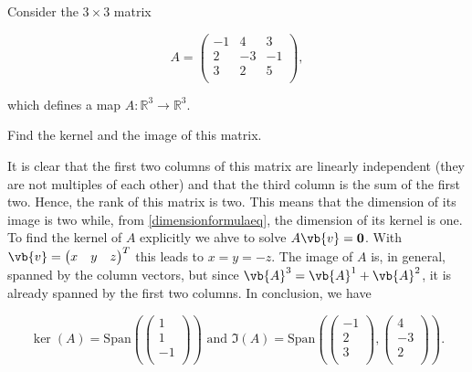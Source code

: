 \documentclass[a4paper,12pt]{report}
\begin{document}
{Consider the \(3 \times 3\) matrix

\begin{equation}
    A = \begin{pmatrix}
        -1 & 4 &  3 \\
        2 & -3 &  -1 \\
        3 & 2 &  5 \\
    \end{pmatrix},
\end{equation}

which defines a map \(A: \mathbb{R}^3 \rightarrow \mathbb{R}^3 \). 

Find the kernel and the image of this matrix.}
{It is clear that the first two columns of this matrix are linearly independent (they are not multiples of each other) and that the third column is the sum of the first two. Hence, the rank of this matrix is two. This means that the dimension of its image is two while, from \cref{dimensionformulaeq}, the dimension of its kernel is one. To find the kernel of \(A\) explicitly we ahve to solve \(A\vb{v} = \boldsymbol{0} \). With \(\vb{v} = \begin{pmatrix}
    x & y &  z \\
\end{pmatrix}^{T} \) this leads to \(x=y=-z\). The image of \(A\) is, in general, spanned by the column vectors, but since \(\vb{A} ^3 = \vb{A} ^{1} + \vb{A} ^2  \), it is already spanned by the first two columns. In conclusion, we have

\begin{equation}
    \ker (A) = \text{Span}\left( \begin{pmatrix}
         1 \\
         1 \\
         -1 \\
    \end{pmatrix} \right) \text { and } \Im (A) = \text{Span} \left( \begin{pmatrix}
         -1 \\
         2 \\
         3 \\
    \end{pmatrix}, \begin{pmatrix}
         4 \\
         -3 \\
         2 \\
    \end{pmatrix} \right). 
\end{equation}} 
\end{document}
